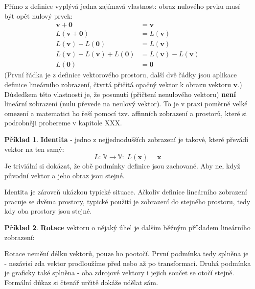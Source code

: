 \documentclass[a5paper,12pt]{amsbook}
\theoremstyle{definition}
\newtheorem{example}{Příklad}[chapter]
\newcommand{\myvec}[1]{\bm{#1}}
\newcommand{\myspace}[1]{\mathbb{#1}}
\newcommand{\mymap}[1]{#1}
\begin{document}
\noindent Přímo z definice vyplývá jedna zajímavá vlastnost: obraz nulového prvku musí být opět
nulový prvek:
\begin{align*}
\myvec{v} + \myvec{0} &= \myvec{v} \\
\mymap{L}(\myvec{v} + \myvec{0}) &= \mymap{L}(\myvec{v}) \\
\mymap{L}(\myvec{v}) + \mymap{L}(\myvec{0}) &= \mymap{L}(\myvec{v}) \\
\mymap{L}(\myvec{v}) - \mymap{L}(\myvec{v}) + \mymap{L}(\myvec{0}) 
    &= \mymap{L}(\myvec{v}) - \mymap{L}(\myvec{v}) \\
\mymap{L}(\myvec{0}) &= \myvec{0}
\end{align*}
(První řádka je z definice vektorového prostoru, další dvě řádky jsou aplikace definice
lineárního zobrazení, čtvrtá přičítá opačný vektor k obrazu vektoru $\myvec{v}$.) Důsledkem
této vlastnosti je, že posunutí (přičtení nenulového vektoru) \textbf{není} lineární zobrazení
(nulu převede na neulový vektor). To je v praxi poměrně velké omezení a matematici ho řeší
pomocí tzv. affinních zobrazení a prostorů, které si podrobněji probereme v kapitole XXX.

\begin{example}\textbf{Identita} - jedno z nejjednodušších zobrazení je takové, které převádí vektor
na ten samý:
\begin{equation*}
\mymap{L}:\,\myspace{V}\rightarrow\myspace{V}:\;\mymap{L}(\myvec{x})=\myvec{x}
\end{equation*} 
Je triviální si dokázat, že obě podmínky definice jsou zachované. Aby ne, když původní vektor
a jeho obraz jsou stejné.

Identita je zároveň ukázkou typické situace. Ačkoliv definice lineárního zobrazení pracuje se dvěma
prostory, typické použití je zobrazení do stejného prostoru, tedy kdy oba prostory jsou stejné.

\end{example}

\begin{example}\label{example:rotate}\textbf{Rotace} vektoru o nějaký úhel je dalším běžným příkladem
lineárního zobrazení:
\begin{center}

\end{center}
Rotace nemění délku vektorů, pouze ho pootočí. První podmínka tedy splněna je - nezávisí zda
vektor prodloužíme před nebo až po transformaci. Druhá podmínka je graficky také splněna - oba zdrojové
vektory i jejich součet se otočí stejně. Formální důkaz si čtenář určitě dokáže udělat sám.

\end{example}
\end{document}
